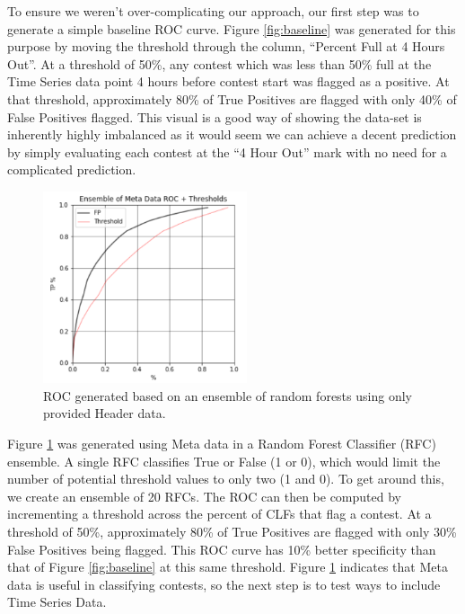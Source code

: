 To ensure we weren't over-complicating our approach, our first step was to generate a simple baseline ROC curve. Figure \ref{fig:baseline} was generated for this purpose by moving the threshold through the column, ``Percent Full at 4 Hours Out''. At a threshold of 50\%, any contest which was less than 50\% full at the Time Series data point 4 hours before contest start was flagged as a positive. At that threshold, approximately 80\% of True Positives are flagged with only 40\% of False Positives flagged. This visual is a good way of showing the data-set is inherently highly imbalanced as it would seem we can achieve a decent prediction by simply evaluating each contest at the ``4 Hour Out'' mark with no need for a complicated prediction.

\begin{figure}[h]
\centering
\includegraphics[width=6cm]{body/results/ensMet.png}
\caption{ROC generated based on an ensemble of random forests using only provided Header data.}
\label{fig:metaonly}
\end{figure}

Figure \ref{fig:metaonly} was generated using Meta data in a Random Forest Classifier (RFC) ensemble. A single RFC classifies True or False (1 or 0), which would limit the number of potential threshold values to only two (1 and 0). To get around this, we create an ensemble of 20 RFCs. The ROC can then be computed by incrementing a threshold across the percent of CLFs that flag a contest. At a threshold of 50\%, approximately 80\% of True Positives are flagged with only 30\% False Positives being flagged. This ROC curve has 10\% better specificity than that of Figure \ref{fig:baseline} at this same threshold. Figure \ref{fig:metaonly} indicates that Meta data is useful in classifying contests, so the next step is to test ways to include Time Series Data.  

